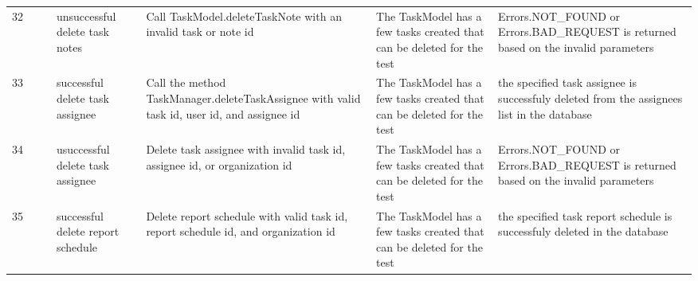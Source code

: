 \documentclass{article}
\begin{document}
{\begin{tabular}{|l|c|l|l|l|l|l|}
    \cellcolor[HTML]{FFFFFF}32                                    & \cellcolor[HTML]{FFFFFF}                                                     & \cellcolor[HTML]{FFFFFF}{\color[HTML]{11734B} Automated}        & unsuccessful delete task notes                 & Call TaskModel.deleteTaskNote with an invalid task or note id                                                                    & \cellcolor[HTML]{FFFFFF}The TaskModel has a few tasks created that can be deleted for the test & \cellcolor[HTML]{FFFFFF}Errors.NOT\_FOUND or Errors.BAD\_REQUEST is returned based on the invalid parameters                  \\ \cline{1-1} \cline{3-7}
    \cellcolor[HTML]{FFFFFF}33                                    & \cellcolor[HTML]{FFFFFF}                                                     & \cellcolor[HTML]{FFFFFF}{\color[HTML]{11734B} Automated}        & successful delete task assignee                & Call the method TaskManager.deleteTaskAssignee with valid task id, user id, and assignee id                                      & \cellcolor[HTML]{FFFFFF}The TaskModel has a few tasks created that can be deleted for the test & \cellcolor[HTML]{FFFFFF}the specified task assignee is successfuly deleted  from the assignees list in the database           \\ \cline{1-1} \cline{3-7}
    \cellcolor[HTML]{FFFFFF}34                                    & \cellcolor[HTML]{FFFFFF}                                                     & \cellcolor[HTML]{FFFFFF}{\color[HTML]{11734B} Automated}        & usuccessful delete task assignee               & Delete task assignee with invalid task id, assignee id, or organization id                                                       & \cellcolor[HTML]{FFFFFF}The TaskModel has a few tasks created that can be deleted for the test & \cellcolor[HTML]{FFFFFF}Errors.NOT\_FOUND or Errors.BAD\_REQUEST is returned based on the invalid parameters                  \\ \cline{1-1} \cline{3-7}
    \cellcolor[HTML]{FFFFFF}35                                    & \cellcolor[HTML]{FFFFFF}                                                     & \cellcolor[HTML]{FFFFFF}{\color[HTML]{11734B} Automated}        & successful delete report schedule              & \cellcolor[HTML]{FFFFFF}Delete report schedule with valid task id, report schedule id, and organization id                       & \cellcolor[HTML]{FFFFFF}The TaskModel has a few tasks created that can be deleted for the test & \cellcolor[HTML]{FFFFFF}the specified task report schedule is successfuly deleted in the database                             \\ \cline{1-1} \cline{3-7}

\end{tabular}}
\end{document}
